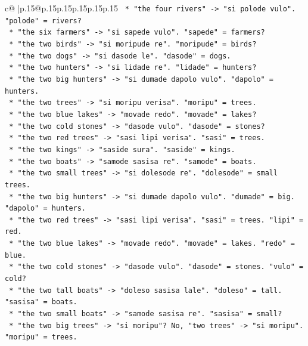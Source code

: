 \documentclass{article}
\begin{document}
{\begin{supertabular}{c@{$\;$}|p{.15\linewidth}@{}p{.15\linewidth}p{.15\linewidth}p{.15\linewidth}p{.15\linewidth}p{.15\linewidth}}
{{{\texttt{            *   "the four rivers" {-}> "si polode vulo". "polode" = rivers?} \\
\texttt{            *   "the six farmers" {-}> "si sapede vulo". "sapede" = farmers?} \\
\texttt{            *   "the two birds" {-}> "si moripude re". "moripude" = birds?} \\
\texttt{            *   "the two dogs" {-}> "si dasode le". "dasode" = dogs.} \\
\texttt{            *   "the two hunters" {-}> "si lidade re". "lidade" = hunters?} \\
\texttt{            *   "the two big hunters" {-}> "si dumade dapolo vulo". "dapolo" = hunters.} \\
\texttt{            *   "the two trees" {-}> "si moripu verisa". "moripu" = trees.} \\
\texttt{            *   "the two blue lakes" {-}> "movade redo". "movade" = lakes?} \\
\texttt{            *   "the two cold stones" {-}> "dasode vulo". "dasode" = stones?} \\
\texttt{            *   "the two red trees" {-}> "sasi lipi verisa". "sasi" = trees.} \\
\texttt{            *   "the two kings" {-}> "saside sura". "saside" = kings.} \\
\texttt{            *   "the two boats" {-}> "samode sasisa re". "samode" = boats.} \\
\texttt{            *   "the two small trees" {-}> "si dolesode re". "dolesode" = small trees.} \\
\texttt{            *   "the two big hunters" {-}> "si dumade dapolo vulo". "dumade" = big. "dapolo" = hunters.} \\
\texttt{            *   "the two red trees" {-}> "sasi lipi verisa". "sasi" = trees. "lipi" = red.} \\
\texttt{            *   "the two blue lakes" {-}> "movade redo". "movade" = lakes. "redo" = blue.} \\
\texttt{            *   "the two cold stones" {-}> "dasode vulo". "dasode" = stones. "vulo" = cold?} \\
\texttt{            *   "the two tall boats" {-}> "doleso sasisa lale". "doleso" = tall. "sasisa" = boats.} \\
\texttt{            *   "the two small boats" {-}> "samode sasisa re". "sasisa" = small?} \\
\texttt{            *   "the two big trees" {-}> "si moripu"? No, "two trees" {-}> "si moripu". "moripu" = trees.} \\
}}}
\end{supertabular}}
\end{document}
